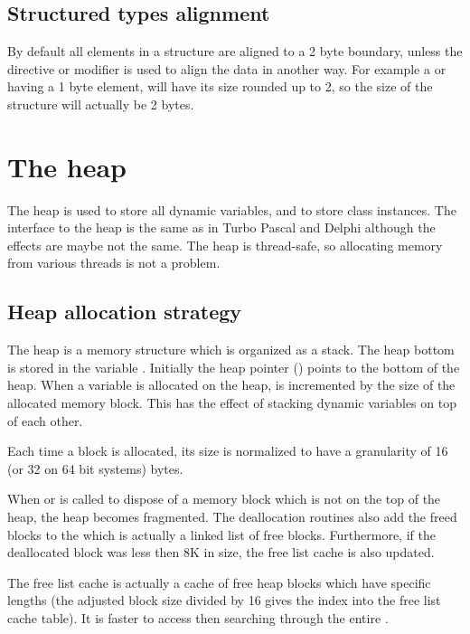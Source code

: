 \subsection{Structured types alignment}
\label{se:StructuredAlignment}

By default all elements in a structure are aligned to a 2 byte boundary,
unless the  directive or  modifier is used
to align the data in another way. For example a  or 
having a 1 byte element, will have its size rounded up to 2, so the size of
the structure will actually be 2 bytes.

\section{The heap}
\label{se:Heap}
The heap is used to store all dynamic variables, and to store class
instances. The interface to the heap is the same as in Turbo Pascal 
and Delphi although the effects are maybe not the same. 
The heap is thread-safe, so allocating memory from various 
threads is not a problem.
\subsection{Heap allocation strategy}

The heap is a memory structure which is organized as a stack. The heap
bottom is stored in the variable . Initially the heap
pointer () points to the bottom of the heap. When a
variable is allocated on the heap,  is incremented by the
size of the allocated memory block. This has the effect of stacking
dynamic variables on top of each other.

Each time a block is allocated, its size is normalized to have
a granularity of 16 (or 32 on 64 bit systems) bytes.

When  or  is called to dispose of a
memory block which is not on the top of the heap, the heap becomes
fragmented. The deallocation routines also add the freed blocks to
the  which is actually a linked list of free blocks.
Furthermore, if the deallocated block was less then 8K in size, the
free list cache is also updated.

The free list cache is actually a cache of free heap blocks which
have specific lengths (the adjusted block size divided by 16 gives the
index into the free list cache table). It is faster to access then
searching through the entire .

